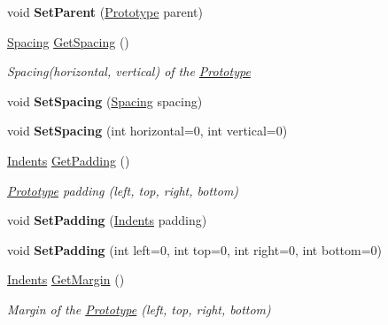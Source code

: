 \begin{DoxyCompactItemize}
void {\bfseries Set\+Parent} (\mbox{\hyperlink{class_space_v_i_l_1_1_prototype}{Prototype}} parent)
\item 
\mbox{\hyperlink{struct_space_v_i_l_1_1_decorations_1_1_spacing}{Spacing}} \mbox{\hyperlink{class_space_v_i_l_1_1_prototype_a615a4bdc121cb4a4e93d3c25ecb2bb35}{Get\+Spacing}} ()
\begin{DoxyCompactList}\small\item\em Spacing(horizontal, vertical) of the \mbox{\hyperlink{class_space_v_i_l_1_1_prototype}{Prototype}} \end{DoxyCompactList}\item 
\mbox{\label{class_space_v_i_l_1_1_prototype_a857f1c5c7d85c1a4ded748af4228099f}} 
void {\bfseries Set\+Spacing} (\mbox{\hyperlink{struct_space_v_i_l_1_1_decorations_1_1_spacing}{Spacing}} spacing)
\item 
\mbox{\label{class_space_v_i_l_1_1_prototype_ad6ef3f9120ecc69438d1e43950648ce5}} 
void {\bfseries Set\+Spacing} (int horizontal=0, int vertical=0)
\item 
\mbox{\hyperlink{struct_space_v_i_l_1_1_decorations_1_1_indents}{Indents}} \mbox{\hyperlink{class_space_v_i_l_1_1_prototype_a861ce67e320359dc1bf36a68b2a039b4}{Get\+Padding}} ()
\begin{DoxyCompactList}\small\item\em \mbox{\hyperlink{class_space_v_i_l_1_1_prototype}{Prototype}} padding (left, top, right, bottom) \end{DoxyCompactList}\item 
\mbox{\label{class_space_v_i_l_1_1_prototype_a0fd3389bccf866272a9e655c70a04a8a}} 
void {\bfseries Set\+Padding} (\mbox{\hyperlink{struct_space_v_i_l_1_1_decorations_1_1_indents}{Indents}} padding)
\item 
\mbox{\label{class_space_v_i_l_1_1_prototype_ac841170beb27ea4e265d7a1b545a2401}} 
void {\bfseries Set\+Padding} (int left=0, int top=0, int right=0, int bottom=0)
\item 
\mbox{\hyperlink{struct_space_v_i_l_1_1_decorations_1_1_indents}{Indents}} \mbox{\hyperlink{class_space_v_i_l_1_1_prototype_aff828c5a3ba3253b301f93ecdb8e4876}{Get\+Margin}} ()
\begin{DoxyCompactList}\small\item\em Margin of the \mbox{\hyperlink{class_space_v_i_l_1_1_prototype}{Prototype}} (left, top, right, bottom) \end{DoxyCompactList}\item 

\end{DoxyCompactItemize}
